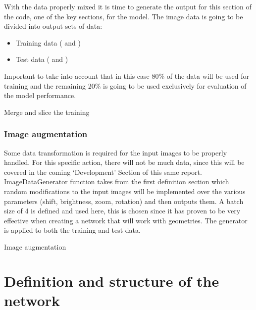 With the data properly mixed it is time to generate the output for this section of the code, one of the key sections, for the model. The image data is going to be divided into output sets of data: 
    
\begin{itemize}
  \item  Training data ( and ) 
  \item  Test data ( and )
\end{itemize}

Important to take into account that in this case 80\% of the data will be used for training and the  remaining 20\% is going to be used exclusively for evaluation of the model performance.


\begin{code}
        
    
    \caption{Merge and slice the training} 
    
\end{code}    


\subsubsection{Image augmentation}

Some data transformation is required for the input images to be properly handled. For this specific action, there will not be much data, since this will be covered in the coming ‘Development’ Section of this same report. ImageDataGenerator function takes from the first definition section which random modifications to the input images will be implemented over the various parameters (shift, brightness, zoom, rotation) and then outputs them. A batch size of 4 is defined and used here, this is chosen since it has proven to be very effective when creating a network that will work with geometries. The generator is applied to both the training and test data.

\begin{code}
        
    
    \caption{Image augmentation} 
    
\end{code}    

\section{Definition and structure of the network}


